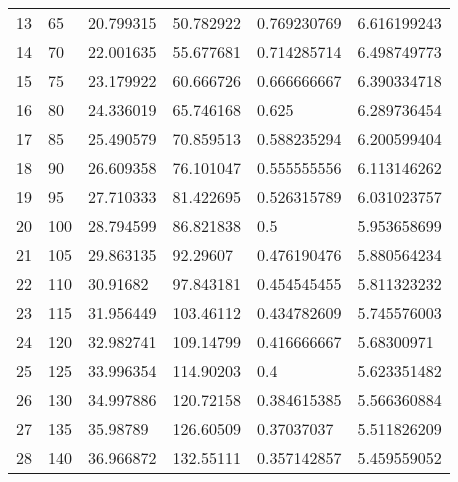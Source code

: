 \documentclass[../Matt_Gebert_Honours_Thesis.tex]{subfiles}
\begin{document}
\begin{longtable}[c]{l|lllll}
	13  & 65                      & 20.799315               & 50.782922 & 0.769230769             & 6.616199243            \\
	14  & 70                      & 22.001635               & 55.677681 & 0.714285714             & 6.498749773            \\
	15  & 75                      & 23.179922               & 60.666726 & 0.666666667             & 6.390334718            \\
	16  & 80                      & 24.336019               & 65.746168 & 0.625                   & 6.289736454            \\
	17  & 85                      & 25.490579               & 70.859513 & 0.588235294             & 6.200599404            \\
	18  & 90                      & 26.609358               & 76.101047 & 0.555555556             & 6.113146262            \\
	19  & 95                      & 27.710333               & 81.422695 & 0.526315789             & 6.031023757            \\
	20  & 100                     & 28.794599               & 86.821838 & 0.5                     & 5.953658699            \\
	21  & 105                     & 29.863135               & 92.29607  & 0.476190476             & 5.880564234            \\
	22  & 110                     & 30.91682                & 97.843181 & 0.454545455             & 5.811323232            \\
	23  & 115                     & 31.956449               & 103.46112 & 0.434782609             & 5.745576003            \\
	24  & 120                     & 32.982741               & 109.14799 & 0.416666667             & 5.68300971             \\
	25  & 125                     & 33.996354               & 114.90203 & 0.4                     & 5.623351482            \\
	26  & 130                     & 34.997886               & 120.72158 & 0.384615385             & 5.566360884            \\
	27  & 135                     & 35.98789                & 126.60509 & 0.37037037              & 5.511826209            \\
	28  & 140                     & 36.966872               & 132.55111 & 0.357142857             & 5.459559052            \\

\end{longtable}
\end{document}
